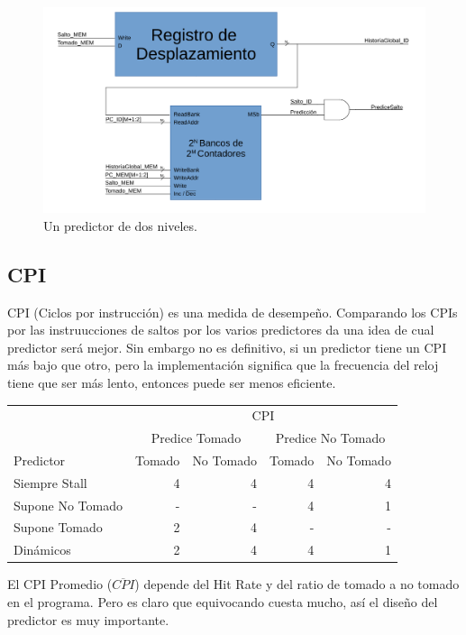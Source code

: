 \documentclass[a4paper]{article}
\begin{document}
\begin{figure}[!htb]
\centering
\includegraphics[scale=0.4]{./img/two_level_predictor}
\caption{Un predictor de dos niveles.}
\label{fig:two_level_predictor}
\end{figure}

\subsection{CPI}

CPI (Ciclos por instrucción) es una medida de desempeño. Comparando los CPIs por las instruucciones de saltos por los varios predictores da una idea de cual predictor será mejor. Sin embargo no es definitivo, si un predictor tiene un CPI más bajo que otro, pero la implementación significa que la frecuencia del reloj tiene que ser más lento, entonces puede ser menos eficiente.

\begin{tabular}{| l | r  r | r r | }
\cline{2-5}
\multicolumn{1}{c|}{} & \multicolumn{4}{c|}{CPI} \\
\cline{2-5}
\multicolumn{1}{c|}{} & \multicolumn{2}{c|}{Predice Tomado} & \multicolumn{2}{c|}{Predice No Tomado} \\ \hline
Predictor & Tomado & No Tomado & Tomado & No Tomado \\ \hline
Siempre Stall       &   4   &   4   &   4   &   4   \\
Supone No Tomado    &   -   &   -   &   4   &   1   \\
Supone Tomado       &   2   &   4   &   -   &   -   \\
Dinámicos           &   2   &   4   &   4   &   1   \\

\hline
\end{tabular}

El CPI Promedio ($\overline{CPI}$) depende del Hit Rate y del ratio de tomado a no tomado en el programa. Pero es claro que equivocando cuesta mucho, así el diseño del predictor es muy importante.
\end{document}
